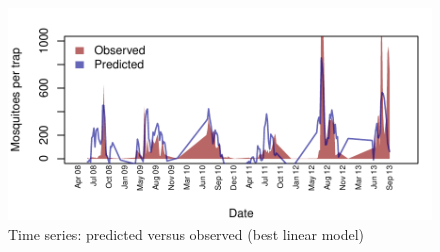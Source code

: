 \documentclass{article}
\begin{document}
\begin{figure}[H]
\begin{center}  
\includegraphics{mosquitoRainTempArticle-008}

\caption{Time series: predicted versus observed (best linear model)}
\end{center}
\end{figure}


\newpage
\end{document}
